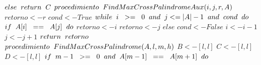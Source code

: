 \documentclass{article}
\begin{document}
\indent\(else\hspace{0,2cm}return\hspace{0,2cm}C\)\newline
\newline
\(procedimiento\hspace{0,2cm}FindMaxCrossPalindromeAux(i,j,r,A)\)\newline
\indent\(retorno<-r\)\newline
\indent\(cond<-True\)\newline
\indent\(while\hspace{0,2cm}i\hspace{0,2cm}>=\hspace{0,2cm}0\hspace{0,2cm}and\hspace{0,2cm}j<=|A|-1\hspace{0,2cm}and\hspace{0,2cm}cond\hspace{0,2cm}do\)\newline
\indent\indent\(if\hspace{0,2cm}A[i]\hspace{0,2cm}==\hspace{0,2cm}A[j]\hspace{0,2cm}do\)\newline
\indent\indent\indent\(retorno<-i\)\newline
\indent\indent\indent\(retorno<-j\)\newline
\indent\indent\(else\)\newline
\indent\indent\indent\(cond<-False\)\newline
\indent\indent\(i<-i-1\)\newline
\indent\indent\(j<-j+1\)\newline
\indent\(return\hspace{0,2cm}retorno\)\newline
\newline
\(procedimiento\hspace{0,2cm}FindMaxCrossPalindrome(A, l, m, h)\)\newline
\indent\(B<-[l,l]\)\newline
\indent\(C<-[l,l]\)\newline
\indent\(D<-[l,l]\)\newline
\indent\(if\hspace{0,2cm}m-1\hspace{0,2cm}>=\hspace{0,2cm}0\hspace{0,2cm}and\hspace{0,2cm}A[m-1]\hspace{0,2cm}==\hspace{0,2cm}A[m+1]\hspace{0,2cm}do\)\newline
\end{document}

